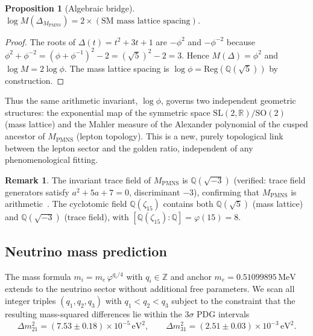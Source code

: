 \documentclass[12pt]{article}
\newtheorem{proposition}[theorem]{Proposition}
\theoremstyle{definition}
\newtheorem{remark}[theorem]{Remark}
\begin{document}
\begin{proposition}[Algebraic bridge]
\label{prop:mahler}
$\log M(\Delta_{M_\text{PMNS}}) = 2 \times (\text{SM mass lattice spacing})$.
\end{proposition}

\begin{proof}
The roots of $\Delta(t)=t^2+3t+1$ are $-\phi^2$ and $-\phi^{-2}$ because
$\phi^2+\phi^{-2}=(\phi+\phi^{-1})^2-2=(\sqrt{5})^2-2=3$.
Hence $M(\Delta)=\phi^2$ and $\log M = 2\log\phi$.  The mass lattice
spacing is $\log\phi = \mathrm{Reg}(\mathbb{Q}(\sqrt{5}))$ by construction.
\end{proof}

Thus the same arithmetic invariant, $\log\phi$, governs two independent
geometric structures: the exponential map of the symmetric space
$\mathrm{SL}(2,\mathbb{R})/\mathrm{SO}(2)$ (mass lattice) and the
Mahler measure of the Alexander polynomial of the cusped ancestor of
$M_\text{PMNS}$ (lepton topology).  This is a new, purely topological
link between the lepton sector and the golden ratio, independent of any
phenomenological fitting.

\begin{remark}
The invariant trace field of $M_\text{PMNS}$ is $\mathbb{Q}(\sqrt{-3})$
(verified: trace field generators satisfy $a^2+5a+7=0$, discriminant
$-3$), confirming that $M_\text{PMNS}$ is arithmetic~\cite{Chinburg98}.
The cyclotomic field $\mathbb{Q}(\zeta_{15})$ contains both
$\mathbb{Q}(\sqrt{5})$ (mass lattice) and $\mathbb{Q}(\sqrt{-3})$
(trace field), with $[\mathbb{Q}(\zeta_{15}):\mathbb{Q}]=\varphi(15)=8$.
\end{remark}


\subsection{Neutrino mass prediction}
\label{subsec:neutrino}

The mass formula $m_i = m_e\,\varphi^{q_i/4}$ with $q_i\in\mathbb{Z}$
and anchor $m_e = 0.51099895\,\text{MeV}$ extends to the neutrino sector
without additional free parameters.  We scan all integer triples
$(q_1,q_2,q_3)$ with $q_1<q_2<q_3$ subject to the constraint that the
resulting mass-squared differences lie within the $3\sigma$ PDG
intervals~\cite{PDG2024}
\begin{equation}
\Delta m^2_{21} = (7.53\pm0.18)\times10^{-5}\,\text{eV}^2, \qquad
\Delta m^2_{31} = (2.51\pm0.03)\times10^{-3}\,\text{eV}^2.
\end{equation}
\end{document}
